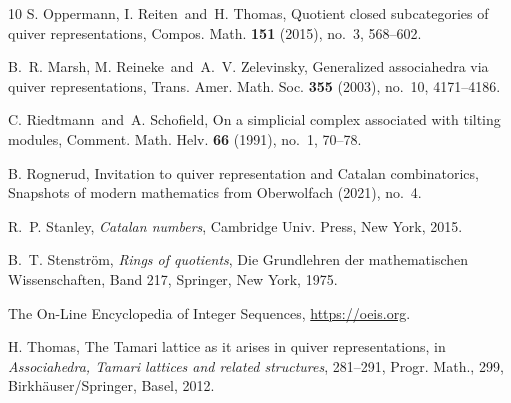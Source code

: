 \documentclass[a4paper]{amsart}
\theoremstyle{plain}
\theoremstyle{definition}
\theoremstyle{remark}
\numberwithin{equation}{section}
\begin{document}
\begin{thebibliography}{10}
 S. Oppermann, I. Reiten\ and\ H. Thomas, Quotient
  closed subcategories of quiver representations, Compos. Math. {\bf
    151} (2015), no.~3, 568--602.

 B.~R. Marsh, M. Reineke\ and\ A.~V. Zelevinsky,
  Generalized associahedra via quiver representations,
  Trans. Amer. Math. Soc. {\bf 355} (2003), no.~10, 4171--4186.

 C. Riedtmann\ and\ A. Schofield, On a simplicial
  complex associated with tilting modules, Comment. Math. Helv. {\bf
    66} (1991), no.~1, 70--78.

 B. Rognerud, Invitation to quiver representation and
  Catalan combinatorics, Snapshots of modern mathematics from
  Oberwolfach (2021), no.~4.
  
 R.~P. Stanley, {\it Catalan numbers}, Cambridge
  Univ. Press, New York, 2015.

 B.~T. Stenstr\"{o}m, {\it Rings of quotients}, Die
  Grundlehren der mathematischen Wissenschaften, Band 217, Springer,
  New York, 1975.

 The On-Line Encyclopedia of Integer Sequences,
  \url{https://oeis.org}.
  
 H. Thomas, The Tamari lattice as it arises in quiver
  representations, in {\it Associahedra, Tamari lattices and related
    structures}, 281--291, Progr. Math., 299, Birkh\"{a}user/Springer,
  Basel, 2012.

\end{thebibliography}
\end{document}
